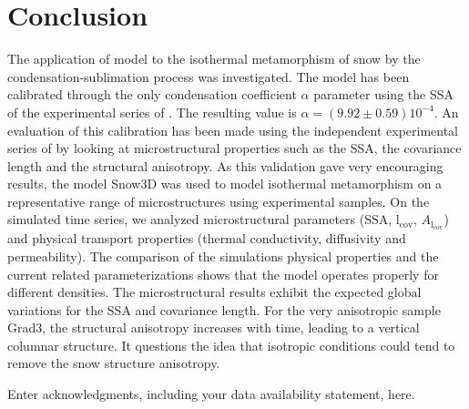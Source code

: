 \documentclass[draft,ms]{agujournal2019}
\begin{document}
\section{Conclusion}

The application of  model to the isothermal metamorphism of snow by the condensation-sublimation process was investigated. The model has been calibrated through the only condensation coefficient $\alpha$ parameter using the SSA of the experimental series of \cite{flin_three-dimensional_2004}. The resulting value is $\alpha = ( 9.92 \pm 0.59) 10^{-4}$. An evaluation of this calibration has been made using the independent experimental series of \cite{hagenmuller_motion_2019} by looking at microstructural properties such as the SSA, the covariance length and the structural anisotropy. As this validation gave very encouraging results, the model Snow3D was used to model isothermal metamorphism on a representative range of microstructures using experimental samples. On the simulated time series, we analyzed microstructural parameters (SSA, $\mathrm{l_{cov}}$, $A_{\mathrm{l_{cov}}}$) and physical transport properties (thermal conductivity, diffusivity and permeability). The comparison of the simulations physical properties and the current related parameterizations shows that the model operates properly for different densities. The microstructural results exhibit the expected global variations for the SSA and covariance length. For the very anisotropic sample Grad3, the structural anisotropy increases with time, leading to a vertical columnar structure. It questions the idea that isotropic conditions could tend to remove the snow structure anisotropy.


\acknowledgments
Enter acknowledgments, including your data availability statement, here.






%
%
%
%
%
\end{document}
